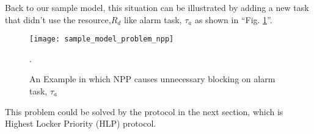 Back to our sample model, this situation can be illustrated by adding a new task that didn't use the resource,$ R_{d}$ like alarm task, $\tau_{a}$ as shown in ``Fig. \ref{fig:sample_model_problem_npp}''.

 
\begin{figure}[ht]
    \centering
    \texttt{[image: sample\_model\_problem\_npp]}
    \caption{An Example in which NPP causes unnecessary blocking on alarm task, $ \tau_{a} $ }.
    \label{fig:sample_model_problem_npp}
\end{figure}

 This problem could be solved by the protocol in the next section, which is Highest Locker Priority (HLP) protocol.